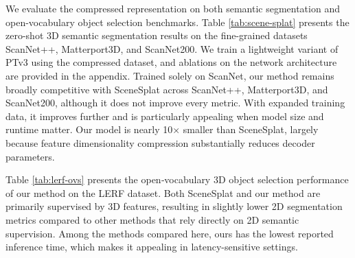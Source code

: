\documentclass{article}
\begin{document}
We evaluate the compressed representation on both semantic segmentation and open-vocabulary object selection benchmarks. Table \ref{tab:scene-splat} presents the zero-shot 3D semantic segmentation results on the fine-grained datasets ScanNet++, Matterport3D, and ScanNet200. We train a lightweight variant of PTv3\cite{wu2024ptv3,yuelitept2026} using the compressed dataset, and ablations on the network architecture are provided in the appendix.
Trained solely on ScanNet, our method remains broadly competitive with SceneSplat across ScanNet++, Matterport3D, and ScanNet200, although it does not improve every metric. With expanded training data, it improves further and is particularly appealing when model size and runtime matter. Our model is nearly 10× smaller than SceneSplat, largely because feature dimensionality compression substantially reduces decoder parameters.

Table \ref{tab:lerf-ovs} presents the open‑vocabulary 3D object selection performance of our method on the LERF dataset. Both SceneSplat and our method are primarily supervised by 3D features, resulting in slightly lower 2D segmentation metrics compared to other methods that rely directly on 2D semantic supervision. Among the methods compared here, ours has the lowest reported inference time, which makes it appealing in latency-sensitive settings.
\end{document}
